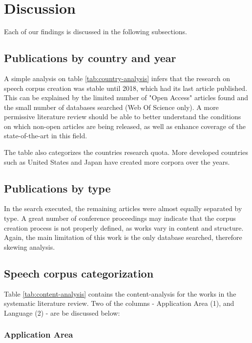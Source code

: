 \section{Discussion}
\label{sec:discussion}

Each of our findings is discussed in the following subsections.

\subsection{Publications by country and year}

A simple analysis on table \ref{tab:country-analysis} infers that the research on speech corpus creation was stable until 2018, which had its last article published. This can be explained by the limited number of "Open Access" articles found and the small number of databases searched (Web Of Science only). A more permissive literature review should be able to better understand the conditions on which non-open articles are being released, as well as enhance coverage of the state-of-the-art in this field.

The table also categorizes the countries research quota. More developed countries such as United States and Japan have created more corpora over the years.

\subsection{Publications by type}

In the search executed, the remaining articles were almost equally separated by type. A great number of conference proceedings may indicate that the corpus creation process is not properly defined, as works vary in content and structure. Again, the main limitation of this work is the only database searched, therefore skewing analysis.

\subsection{Speech corpus categorization}

Table \ref{tab:content-analysis} contains the content-analysis for the works in the systematic literature review. Two of the columns - Application Area (1), and Language (2) - are be discussed below:

\subsubsection{Application Area}

